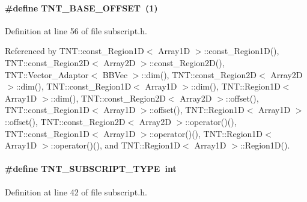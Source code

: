 \paragraph[{TNT\_\-BASE\_\-OFFSET}]{\setlength{\rightskip}{0pt plus 5cm}\#define TNT\_\-BASE\_\-OFFSET~(1)}\hfill\label{subscript_8h_a78d6fd551f343b6837c74aab34fa268c}


Definition at line 56 of file subscript.h.



Referenced by TNT::const\_\-Region1D$<$ Array1D $>$::const\_\-Region1D(), TNT::const\_\-Region2D$<$ Array2D $>$::const\_\-Region2D(), TNT::Vector\_\-Adaptor$<$ BBVec $>$::dim(), TNT::const\_\-Region2D$<$ Array2D $>$::dim(), TNT::const\_\-Region1D$<$ Array1D $>$::dim(), TNT::Region1D$<$ Array1D $>$::dim(), TNT::const\_\-Region2D$<$ Array2D $>$::offset(), TNT::const\_\-Region1D$<$ Array1D $>$::offset(), TNT::Region1D$<$ Array1D $>$::offset(), TNT::const\_\-Region2D$<$ Array2D $>$::operator()(), TNT::const\_\-Region1D$<$ Array1D $>$::operator()(), TNT::Region1D$<$ Array1D $>$::operator()(), and TNT::Region1D$<$ Array1D $>$::Region1D().

\paragraph[{TNT\_\-SUBSCRIPT\_\-TYPE}]{\setlength{\rightskip}{0pt plus 5cm}\#define TNT\_\-SUBSCRIPT\_\-TYPE~int}\hfill\label{subscript_8h_ae204fca2c823f77ee865da86d3bf53d0}


Definition at line 42 of file subscript.h.

